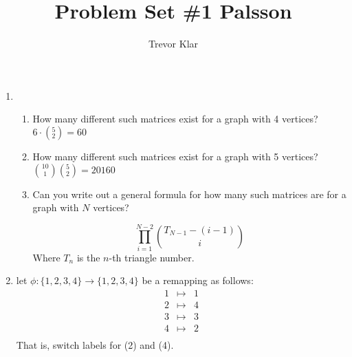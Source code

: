 \documentclass[letterpaper]{article}
\title{Problem Set \#1 \linebreak
Palsson}
\author{Trevor Klar}
\begin{document}
\maketitle

\begin{enumerate}
\item \mbox{}
	\begin{enumerate}
	\item How many different such matrices exist for a graph with 4 vertices?
	\answer	$6\cdot \left({}^5_2\right) = 60$
	
	\item How many different such matrices exist for a graph with 5 vertices?
	\answer	${10 \choose 1} \left({}^5_2\right) = 20160$
	
	\item Can you write out a general formula for how many such matrices are for a graph with $N$
vertices?

	\answer $$\prod\limits_{i=1}^{N-2} {{T_{N-1}-(i-1)} \choose {i}}$$
	Where $T_n$ is the $n$-th triangle number. 
	\end{enumerate}

\item let $\phi:\{1,2,3,4\}\to\{1,2,3,4\}$ be a remapping as follows:
\[\begin{array}{rcl}
1 &\mapsto& 1\\
2 &\mapsto& 4\\
3 &\mapsto& 3\\
4 &\mapsto& 2\\
\end{array}\]
That is, switch labels for (2) and (4). 
\end{enumerate}
\end{document}
